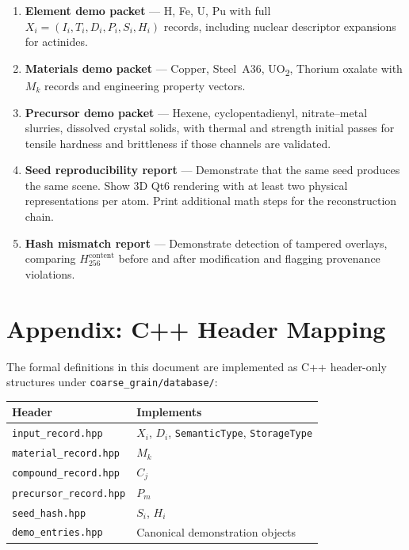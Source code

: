 \documentclass[11pt, a4paper, oneside]{article}
\begin{document}
\begin{enumerate}
  \item \textbf{Element demo packet} — H, Fe, U, Pu with full
    $X_i = (I_i, T_i, D_i, P_i, S_i, H_i)$ records, including
    nuclear descriptor expansions for actinides.

  \item \textbf{Materials demo packet} — Copper, Steel~A36, UO\textsubscript{2},
    Thorium oxalate with $M_k$ records and engineering property vectors.

  \item \textbf{Precursor demo packet} — Hexene, cyclopentadienyl,
    nitrate--metal slurries, dissolved crystal solids, with thermal
    and strength initial passes for tensile hardness and brittleness
    if those channels are validated.

  \item \textbf{Seed reproducibility report} — Demonstrate that the same
    seed produces the same scene.  Show 3D Qt6 rendering with at least
    two physical representations per atom.  Print additional math steps
    for the reconstruction chain.

  \item \textbf{Hash mismatch report} — Demonstrate detection of tampered
    overlays, comparing $H_{256}^{\text{content}}$ before and after
    modification and flagging provenance violations.
\end{enumerate}


\section*{Appendix: C++ Header Mapping}
\label{sec:appendix_headers}

The formal definitions in this document are implemented as C++ header-only
structures under \texttt{coarse\_grain/database/}:

\begin{center}
\begin{tabular}{@{} l l @{}}
\toprule
\textbf{Header} & \textbf{Implements}\\
\midrule
\texttt{input\_record.hpp}     & $X_i$, $D_i$, \texttt{SemanticType}, \texttt{StorageType}\\
\texttt{material\_record.hpp}  & $M_k$\\
\texttt{compound\_record.hpp}  & $C_j$\\
\texttt{precursor\_record.hpp} & $P_m$\\
\texttt{seed\_hash.hpp}        & $S_i$, $H_i$\\
\texttt{demo\_entries.hpp}     & Canonical demonstration objects\\
\bottomrule
\end{tabular}
\end{center}

\end{document}
